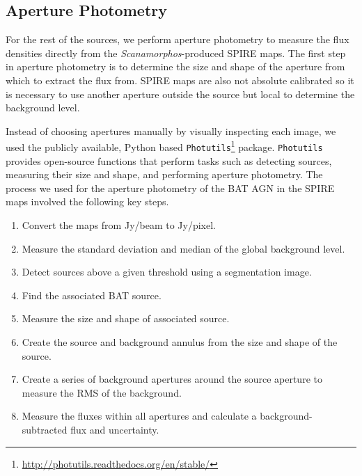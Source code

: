 \subsection{Aperture Photometry}\label{aperture}
For the rest of the sources, we perform aperture photometry to measure the flux densities directly from the \textit{Scanamorphos}-produced SPIRE maps. The first step in aperture photometry is to determine the size and shape of the aperture from which to extract the flux from. SPIRE maps are also not absolute calibrated so it is necessary to use another aperture outside the source but local to determine the background level.

Instead of choosing apertures manually by visually inspecting each image, we used the publicly available, Python based \texttt{Photutils}\footnote{\url{http://photutils.readthedocs.org/en/stable/}} package. \texttt{Photutils} provides open-source functions that perform tasks such as detecting sources, measuring their size and shape, and performing aperture photometry. The process we used for the aperture photometry of the BAT AGN in the SPIRE maps involved the following key steps.

\begin{enumerate}
    \item Convert the maps from Jy/beam to Jy/pixel.
    \item Measure the standard deviation and median of the global background level.
    \item Detect sources above a given threshold using a segmentation image.
    \item Find the associated BAT source.
    \item Measure the size and shape of associated source.
    \item Create the source and background annulus from the size and shape of the source.
    \item Create a series of background apertures around the source aperture to measure the RMS of the background.
    \item Measure the fluxes within all apertures and calculate a background-subtracted flux and uncertainty.
\end{enumerate}
  
  
  
  
  